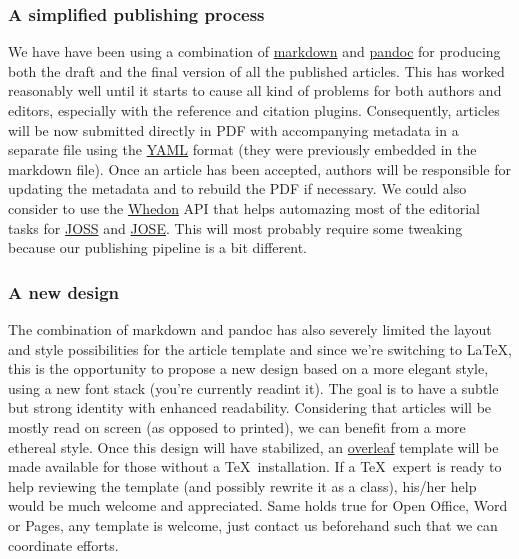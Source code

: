 \subsubsection{A simplified publishing process}

We have have been using a combination of
\href{https://daringfireball.net/projects/markdown/syntax}{markdown} and
\href{http://pandoc.org/}{pandoc} for producing both the draft and the final
version of all the published articles. This has worked reasonably well until it
starts to cause all kind of problems for both authors and editors, especially
with the reference and citation plugins. Consequently, articles will be now
submitted directly in PDF with accompanying metadata in a separate file using
the \href{https://en.wikipedia.org/wiki/YAML}{YAML} format (they were
previously embedded in the markdown file). Once an article has been accepted,
authors will be responsible for updating the metadata and to rebuild the PDF if
necessary. We could also consider to use the
\href{https://github.com/openjournals/whedon}{Whedon} API that helps automazing
most of the editorial tasks for \href{http://joss.theoj.org/}{JOSS} and
\href{http://jose.theoj.org/}{JOSE}. This will most probably require some
tweaking because our publishing pipeline is a bit different.


\subsubsection{A new design}

The combination of markdown and pandoc has also severely limited the layout and
style possibilities for the article template and since we're switching to
\LaTeX, this is the opportunity to propose a new design based on a more elegant
style, using a new font stack\supercite{SourceSerifPro:2014, Roboto:2011,
  SourceCodePro:2012} (you're currently readint it). The goal is to have a
subtle but strong identity with enhanced readability. Considering that articles
will be mostly read on screen (as opposed to printed), we can benefit from a
more ethereal style. Once this design will have stabilized, an
\href{https://www.overleaf.com/}{overleaf} template will be made available for
those without a \TeX~installation. If a \TeX~expert is ready to help reviewing
the template (and possibly rewrite it as a class), his/her help would be much
welcome and appreciated. Same holds true for Open Office, Word or Pages, any
template is welcome, just contact us beforehand such that we can coordinate
efforts.


